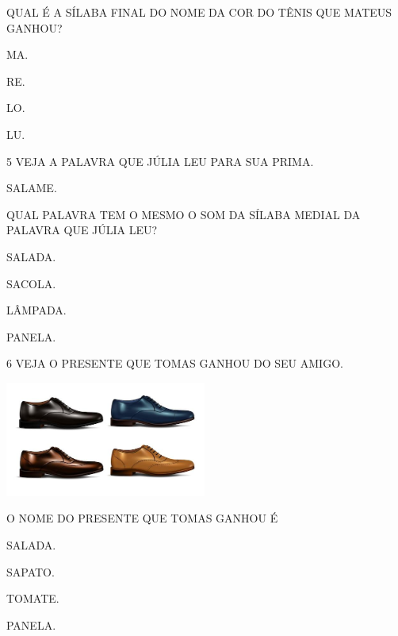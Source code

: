 QUAL É A SÍLABA FINAL DO NOME DA COR DO TÊNIS QUE MATEUS GANHOU?

\begin{escolha}
\item MA.

\item RE.

\item LO.

\item LU.
\end{escolha}

\num{5} VEJA A PALAVRA QUE JÚLIA LEU PARA SUA PRIMA.

\begin{mdframed}[linewidth=2pt,linecolor=azul!20,backgroundcolor=azul!20,roundcorner=2pt]
SALAME.
\end{mdframed}

QUAL PALAVRA TEM O MESMO O SOM DA SÍLABA MEDIAL DA PALAVRA QUE JÚLIA LEU?

\begin{escolha}
\item SALADA.

\item SACOLA.

\item LÂMPADA.

\item PANELA.
\end{escolha}

\num{6} VEJA O PRESENTE QUE TOMAS GANHOU DO SEU AMIGO.

\includegraphics[width=2.60694in,height=1.48889in]{media/image191.jpg}


O NOME DO PRESENTE QUE TOMAS GANHOU É

\begin{escolha}
\item SALADA.

\item SAPATO.

\item TOMATE.

\item PANELA.
\end{escolha}

